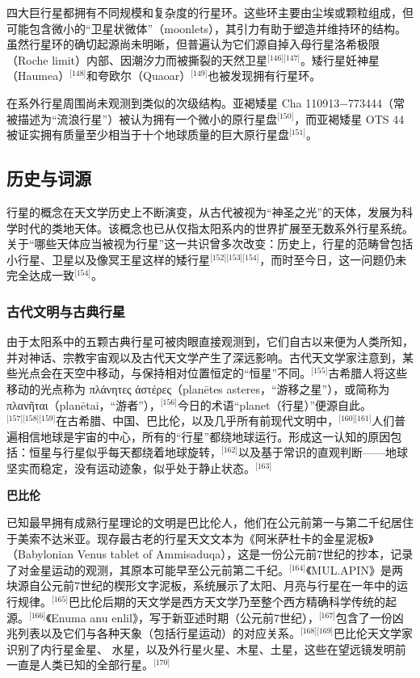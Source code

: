 四大巨行星都拥有不同规模和复杂度的行星环。这些环主要由尘埃或颗粒组成，但可能包含微小的“卫星状微体”（moonlets），其引力有助于塑造并维持环的结构。虽然行星环的确切起源尚未明晰，但普遍认为它们源自掉入母行星洛希极限（Roche limit）内部、因潮汐力而被撕裂的天然卫星\(^\text{[146][147]}\)。矮行星妊神星（Haumea）\(^\text{[148]}\)和夸欧尔（Quaoar）\(^\text{[149]}\)也被发现拥有行星环。

在系外行星周围尚未观测到类似的次级结构。亚褐矮星 Cha 110913−773444（常被描述为“流浪行星”）被认为拥有一个微小的原行星盘\(^\text{[150]}\)，而亚褐矮星 OTS 44 被证实拥有质量至少相当于十个地球质量的巨大原行星盘\(^\text{[151]}\)。
\subsection{历史与词源}
行星的概念在天文学历史上不断演变，从古代被视为“神圣之光”的天体，发展为科学时代的类地天体。该概念也已从仅指太阳系内的世界扩展至无数系外行星系统。关于“哪些天体应当被视为行星”这一共识曾多次改变：历史上，行星的范畴曾包括小行星、卫星以及像冥王星这样的矮行星\(^\text{[152][153][154]}\)，而时至今日，这一问题仍未完全达成一致\(^\text{[154]}\)。
\subsubsection{古代文明与古典行星}
由于太阳系中的五颗古典行星可被肉眼直接观测到，它们自古以来便为人类所知，并对神话、宗教宇宙观以及古代天文学产生了深远影响。古代天文学家注意到，某些光点会在天空中移动，与保持相对位置恒定的“恒星”不同。\(^\text{[155]}\)古希腊人将这些移动的光点称为 πλάνητες ἀστέρες（planētes asteres，“游移之星”），或简称为 πλανῆται（planētai，“游者”），\(^\text{[156]}\)今日的术语“planet（行星）”便源自此。\(^\text{[157][158][159]}\)在古希腊、中国、巴比伦，以及几乎所有前现代文明中，\(^\text{[160][161]}\)人们普遍相信地球是宇宙的中心，所有的“行星”都绕地球运行。形成这一认知的原因包括：恒星与行星似乎每天都绕着地球旋转，\(^\text{[162]}\)以及基于常识的直观判断——地球坚实而稳定，没有运动迹象，似乎处于静止状态。\(^\text{[163]}\)

\textbf{巴比伦}

已知最早拥有成熟行星理论的文明是巴比伦人，他们在公元前第一与第二千纪居住于美索不达米亚。现存最古老的行星天文文本为《阿米萨杜卡的金星泥板》（Babylonian Venus tablet of Ammisaduqa），这是一份公元前7世纪的抄本，记录了对金星运动的观测，其原本可能早至公元前第二千纪。\(^\text{[164]}\)《MUL.APIN》是两块源自公元前7世纪的楔形文字泥板，系统展示了太阳、月亮与行星在一年中的运行规律。\(^\text{[165]}\)巴比伦后期的天文学是西方天文学乃至整个西方精确科学传统的起源。\(^\text{[166]}\)《Enuma anu enlil》，写于新亚述时期（公元前7世纪），\(^\text{[167]}\)包含了一份凶兆列表以及它们与各种天象（包括行星运动）的对应关系。\(^\text{[168][169]}\)巴比伦天文学家识别了内行星金星、 水星，以及外行星火星、木星、土星，这些在望远镜发明前一直是人类已知的全部行星。\(^\text{[170]}\)

